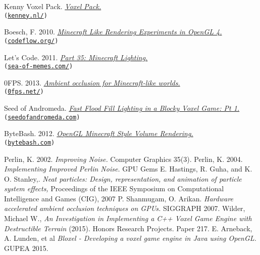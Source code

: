 \documentclass[a4paper,11pt,titlepage]{scrartcl}
\begin{document}
\begin{enumerate}[label*={[\arabic{enumi}]}]
\item Kenny Voxel Pack. {\em \href{http://kenney.nl/assets/voxel-pack}{Voxel Pack.}} \\\texttt{(\url{kenney.nl/})}
\item Boesch, F. 2010. {\em \href{http://codeflow.org/entries/2010/dec/09/minecraft-like-rendering-experiments-in-opengl-4/#ambient-occlusion}{Minecraft Like Rendering Experiments in OpenGL 4.}}\\\texttt{(\url{codeflow.org/})}
\item Let's Code. 2011. {\em \href{http://www.sea-of-memes.com/LetsCode35/LetsCode35.html}{Part 35: Minecraft Lighting.}}\\\texttt{(\url{sea-of-memes.com/})}
\item 0FPS. 2013. {\em \href{https://0fps.net/2013/07/03/ambient-occlusion-for-minecraft-like-worlds/}{Ambient occlusion for Minecraft-like worlds.}}\\\texttt{(\url{0fps.net/})}
\item Seed of Andromeda. {\em \href{https://www.seedofandromeda.com/blogs/29-fast-flood-fill-lighting-in-a-blocky-voxel-game-pt-1/}{Fast Flood Fill Lighting in a Blocky Voxel Game: Pt 1.}}\\\texttt{(\url{seedofandromeda.com})}
\item ByteBash. 2012. {\em \href{http://bytebash.com/2012/03/opengl-volume-rendering/}{OpenGL Minecraft Style Volume Rendering.}} \\\texttt{(\url{bytebash.com})}
\end{enumerate}


\nocite{*}
\begin{thebibliography}{1}
	 Perlin, K. 2002. {\em Improving Noise.} Computer Graphics 35(3).
	  Perlin, K. 2004. {\em Implementing Improved Perlin Noise.} GPU Gems
	  E. Hastings, R. Guha, and K. O. Stanley,. {\em Neat particles: Design, representation, and animation of particle system effects,} Proceedings of the IEEE Symposium on Computational Intelligence and Games (CIG), 2007
	 P. Shanmugam, O. Arikan. {\em Hardware accelerated ambient occlusion techniques on GPUs. }  SIGGRAPH 2007.
	  Wilder, Michael W., {\em An Investigation in Implementing a C++ Voxel Game Engine with Destructible Terrain } (2015). Honors Research Projects. Paper 217.
	 E. Arneback, A. Lunden, et al {\em Bloxel - Developing a voxel game engine in Java using OpenGL. } GUPEA 2015.
\end{thebibliography}

\clearpage
\end{document}
